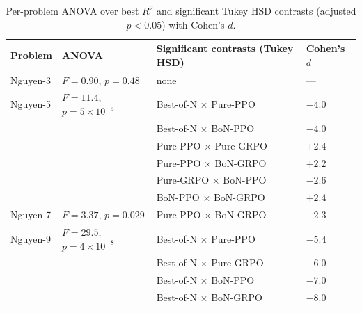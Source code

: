 \begin{table}[htbp]
    \centering
    \caption[ANOVA and post-hoc tests for Phase 2]{Per-problem ANOVA over best $R^2$ and significant Tukey HSD contrasts (adjusted $p < 0.05$) with Cohen's $d$.}
    \label{tab:anova}
    \small
    \begin{tabular}{llll}
    \toprule
    \textbf{Problem} & \textbf{ANOVA} & \textbf{Significant contrasts (Tukey HSD)} & \textbf{Cohen's $d$} \\
    \midrule
    Nguyen-3 & $F=0.90$, $p=0.48$  & none & --- \\
    \midrule
    Nguyen-5 & $F=11.4$, $p=5\times10^{-5}$ & Best-of-N $\times$ Pure-PPO   & $-4.0$ \\
             &                     & Best-of-N $\times$ BoN-PPO    & $-4.0$ \\
             &                     & Pure-PPO $\times$ Pure-GRPO   & $+2.4$ \\
             &                     & Pure-PPO $\times$ BoN-GRPO    & $+2.2$ \\
             &                     & Pure-GRPO $\times$ BoN-PPO    & $-2.6$ \\
             &                     & BoN-PPO $\times$ BoN-GRPO     & $+2.4$ \\
    \midrule
    Nguyen-7 & $F=3.37$, $p=0.029$ & Pure-PPO $\times$ BoN-GRPO    & $-2.3$ \\
    \midrule
    Nguyen-9 & $F=29.5$, $p=4\times10^{-8}$ & Best-of-N $\times$ Pure-PPO   & $-5.4$ \\
             &                     & Best-of-N $\times$ Pure-GRPO  & $-6.0$ \\
             &                     & Best-of-N $\times$ BoN-PPO    & $-7.0$ \\
             &                     & Best-of-N $\times$ BoN-GRPO   & $-8.0$ \\
    \bottomrule
    \end{tabular}
\end{table}

